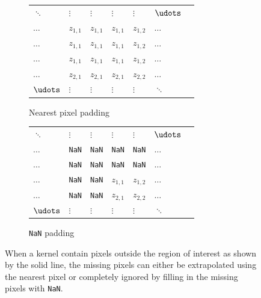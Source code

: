 \begin{figure}
  \centering
  \begin{subfigure}[b]{\subSize}
      \begin{tabular}{lllllll}
         $\ddots$ & $\vdots$ & $\vdots$ & $\vdots$ & $\vdots$ & $\udots$ \\
         $\dotsc$ & $z_{1,1}$ & $z_{1,1}$ & $z_{1,1}$ & $z_{1,2}$ & $\dotsc$ \\
         $\dotsc$ & $z_{1,1}$ & $z_{1,1}$ & $z_{1,1}$ & $z_{1,2}$ & $\dotsc$ \\ \cline{4-6}
         $\dotsc$ & $z_{1,1}$ & \multicolumn{1}{l|}{$z_{1,1}$} & $z_{1,1}$ & $z_{1,2}$ & $\dotsc$ \\
         $\dotsc$ & $z_{2,1}$ & \multicolumn{1}{l|}{$z_{2,1}$}  & $z_{2,1}$ & $z_{2,2}$ & $\dotsc$ \\
         $\udots$ & $\vdots$ & \multicolumn{1}{l|}{$\vdots$}  & $\vdots$ & $\vdots$ & $\ddots$
    \end{tabular}
    \caption{Nearest pixel padding}
    \label{fig:inference_padding_nearest}
  \end{subfigure}
  \begin{subfigure}[b]{\subSize}
      \begin{tabular}{lllllll}
         $\ddots$ & $\vdots$ & $\vdots$ & $\vdots$ & $\vdots$ & $\udots$ \\
         $\dotsc$ & \texttt{NaN} & \texttt{NaN} & \texttt{NaN} & \texttt{NaN} & $\dotsc$ \\
         $\dotsc$ & \texttt{NaN} & \texttt{NaN} & \texttt{NaN} & \texttt{NaN} & $\dotsc$ \\ \cline{4-6}
         $\dotsc$ & \texttt{NaN} & \multicolumn{1}{l|}{\texttt{NaN}} & $z_{1,1}$ & $z_{1,2}$ & $\dotsc$ \\
         $\dotsc$ & \texttt{NaN} & \multicolumn{1}{l|}{\texttt{NaN}}  & $z_{2,1}$ & $z_{2,2}$ & $\dotsc$ \\
         $\udots$ & $\vdots$ & \multicolumn{1}{l|}{$\vdots$}  & $\vdots$ & $\vdots$ & $\ddots$
    \end{tabular}
    \caption{\texttt{NaN} padding}
    \label{fig:inference_padding_nan}
  \end{subfigure}
  \caption{When a kernel contain pixels outside the region of interest as shown by the solid line, the missing pixels can either be extrapolated using the nearest pixel or completely ignored by filling in the missing pixels with \texttt{NaN}.}
  \label{fig:inference_padding}
\end{figure}

